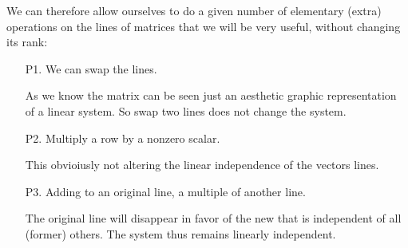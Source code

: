 	We can therefore allow ourselves to do a given number of elementary (extra) operations on the lines of matrices that we will be very useful, without changing its rank:
	\begin{enumerate}
		\item[P1.] We can swap the lines.
		\begin{tcolorbox}[title=Remark,colframe=black,arc=10pt]
		As we know the matrix can be seen just an aesthetic graphic representation of a linear system. So swap two lines does not change the system.
		\end{tcolorbox} 
		
		\item[P2.] Multiply a row by a nonzero scalar.
		\begin{tcolorbox}[title=Remark,colframe=black,arc=10pt]
		This obvioiusly not altering the linear independence of the vectors lines.
		\end{tcolorbox} 
		
		\item[P3.] Adding to an original line, a multiple of another line.
		\begin{tcolorbox}[title=Remark,colframe=black,arc=10pt]
		The original line will disappear in favor of the new that is independent of all (former) others. The system thus remains linearly independent.
		\end{tcolorbox} 
	\end{enumerate}
	
